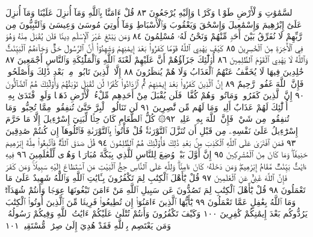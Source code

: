 ٱلسَّمَٰوَٰتِ وَٱلْأَرْضِ طَوْعࣰا وَكَرْهࣰا وَإِلَيْهِ يُرْجَعُونَ ٨٣
قُلْ ءَامَنَّا بِٱللَّهِ وَمَآ أُنزِلَ عَلَيْنَا وَمَآ أُنزِلَ عَلَىٰٓ إِبْرَٰهِيمَ
وَإِسْمَٰعِيلَ وَإِسْحَٰقَ وَيَعْقُوبَ وَٱلْأَسْبَاطِ وَمَآ أُوتِيَ مُوسَىٰ
وَعِيسَىٰ وَٱلنَّبِيُّونَ مِن رَّبِّهِمْ لَا نُفَرِّقُ بَيْنَ أَحَدࣲ مِّنْهُمْ
وَنَحْنُ لَهُۥ مُسْلِمُونَ ٨٤ وَمَن يَبْتَغِ غَيْرَ ٱلْإِسْلَٰمِ دِينࣰا فَلَن
يُقْبَلَ مِنْهُ وَهُوَ فِي ٱلْأٓخِرَةِ مِنَ ٱلْخَٰسِرِينَ ٨٥ كَيْفَ
يَهْدِي ٱللَّهُ قَوْمࣰا كَفَرُوا۟ بَعْدَ إِيمَٰنِهِمْ وَشَهِدُوٓا۟ أَنَّ
ٱلرَّسُولَ حَقࣱّ وَجَآءَهُمُ ٱلْبَيِّنَٰتُۚ وَٱللَّهُ لَا يَهْدِي ٱلْقَوْمَ
ٱلظَّٰلِمِينَ ٨٦ أُو۟لَٰٓئِكَ جَزَآؤُهُمْ أَنَّ عَلَيْهِمْ لَعْنَةَ ٱللَّهِ
وَٱلْمَلَٰٓئِكَةِ وَٱلنَّاسِ أَجْمَعِينَ ٨٧ خَٰلِدِينَ فِيهَا لَا يُخَفَّفُ
عَنْهُمُ ٱلْعَذَابُ وَلَا هُمْ يُنظَرُونَ ٨٨ إِلَّا ٱلَّذِينَ تَابُوا۟ مِنۢ
بَعْدِ ذَٰلِكَ وَأَصْلَحُوا۟ فَإِنَّ ٱللَّهَ غَفُورࣱ رَّحِيمٌ ٨٩ إِنَّ ٱلَّذِينَ
كَفَرُوا۟ بَعْدَ إِيمَٰنِهِمْ ثُمَّ ٱزْدَادُوا۟ كُفْرࣰا لَّن تُقْبَلَ تَوْبَتُهُمْ
وَأُو۟لَٰٓئِكَ هُمُ ٱلضَّآلُّونَ ٩٠ إِنَّ ٱلَّذِينَ كَفَرُوا۟ وَمَاتُوا۟ وَهُمْ
كُفَّارࣱ فَلَن يُقْبَلَ مِنْ أَحَدِهِم مِّلْءُ ٱلْأَرْضِ ذَهَبࣰا وَلَوِ
ٱفْتَدَىٰ بِهِۦٓۗ أُو۟لَٰٓئِكَ لَهُمْ عَذَابٌ أَلِيمࣱ وَمَا لَهُم مِّن نَّٰصِرِينَ ٩١
لَن تَنَالُوا۟ ٱلْبِرَّ حَتَّىٰ تُنفِقُوا۟ مِمَّا تُحِبُّونَۚ وَمَا تُنفِقُوا۟ مِن شَيْءࣲ
فَإِنَّ ٱللَّهَ بِهِۦ عَلِيمࣱ ٩٢۞ كُلُّ ٱلطَّعَامِ كَانَ حِلࣰّا لِّبَنِيٓ
إِسْرَٰٓءِيلَ إِلَّا مَا حَرَّمَ إِسْرَٰٓءِيلُ عَلَىٰ نَفْسِهِۦ مِن قَبْلِ أَن تُنَزَّلَ
ٱلتَّوْرَىٰةُۚ قُلْ فَأْتُوا۟ بِٱلتَّوْرَىٰةِ فَٱتْلُوهَآ إِن كُنتُمْ صَٰدِقِينَ ٩٣
فَمَنِ ٱفْتَرَىٰ عَلَى ٱللَّهِ ٱلْكَذِبَ مِنۢ بَعْدِ ذَٰلِكَ فَأُو۟لَٰٓئِكَ
هُمُ ٱلظَّٰلِمُونَ ٩٤ قُلْ صَدَقَ ٱللَّهُۗ فَٱتَّبِعُوا۟ مِلَّةَ إِبْرَٰهِيمَ حَنِيفࣰاۖ
وَمَا كَانَ مِنَ ٱلْمُشْرِكِينَ ٩٥ إِنَّ أَوَّلَ بَيْتࣲ وُضِعَ لِلنَّاسِ لَلَّذِي
بِبَكَّةَ مُبَارَكࣰا وَهُدࣰى لِّلْعَٰلَمِينَ ٩٦ فِيهِ ءَايَٰتُۢ بَيِّنَٰتࣱ مَّقَامُ
إِبْرَٰهِيمَۖ وَمَن دَخَلَهُۥ كَانَ ءَامِنࣰاۗ وَلِلَّهِ عَلَى ٱلنَّاسِ حِجُّ ٱلْبَيْتِ
مَنِ ٱسْتَطَاعَ إِلَيْهِ سَبِيلࣰاۚ وَمَن كَفَرَ فَإِنَّ ٱللَّهَ غَنِيٌّ عَنِ ٱلْعَٰلَمِينَ ٩٧
قُلْ يَٰٓأَهْلَ ٱلْكِتَٰبِ لِمَ تَكْفُرُونَ بِـَٔايَٰتِ ٱللَّهِ وَٱللَّهُ شَهِيدٌ
عَلَىٰ مَا تَعْمَلُونَ ٩٨ قُلْ يَٰٓأَهْلَ ٱلْكِتَٰبِ لِمَ تَصُدُّونَ عَن
سَبِيلِ ٱللَّهِ مَنْ ءَامَنَ تَبْغُونَهَا عِوَجࣰا وَأَنتُمْ شُهَدَآءُۗ وَمَا ٱللَّهُ
بِغَٰفِلٍ عَمَّا تَعْمَلُونَ ٩٩ يَٰٓأَيُّهَا ٱلَّذِينَ ءَامَنُوٓا۟ إِن تُطِيعُوا۟ فَرِيقࣰا
مِّنَ ٱلَّذِينَ أُوتُوا۟ ٱلْكِتَٰبَ يَرُدُّوكُم بَعْدَ إِيمَٰنِكُمْ كَٰفِرِينَ ١٠٠
وَكَيْفَ تَكْفُرُونَ وَأَنتُمْ تُتْلَىٰ عَلَيْكُمْ ءَايَٰتُ ٱللَّهِ وَفِيكُمْ
رَسُولُهُۥۗ وَمَن يَعْتَصِم بِٱللَّهِ فَقَدْ هُدِيَ إِلَىٰ صِرَٰطࣲ مُّسْتَقِيمࣲ ١٠١
